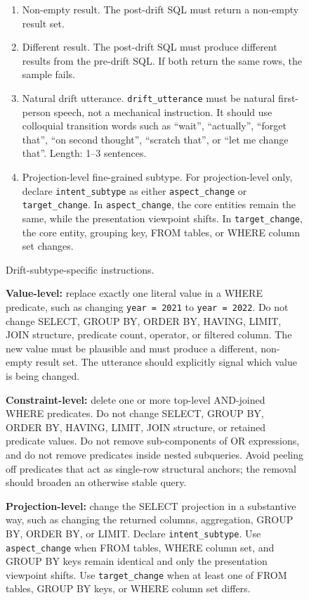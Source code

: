 \begin{figure}[t]
\begin{tcolorbox}[
  width=1.03\textwidth,
  enhanced,
  colback=white,
  colframe=black,
  boxrule=0.5pt,
  arc=0.8mm,
  left=1.6mm,
  right=1.6mm,
  top=1.3mm,
  bottom=1.3mm
]
\begin{enumerate}[leftmargin=1.8em,itemsep=0.22em,topsep=0.15em,label=R\arabic*.]
    \item Non-empty result.
    The post-drift SQL must return a non-empty result set.

    \item Different result.
    The post-drift SQL must produce different results from the pre-drift SQL. If
    both return the same rows, the sample fails.

    \item Natural drift utterance.
    \texttt{drift\_utterance} must be natural first-person speech, not a
    mechanical instruction. It should use colloquial transition words such as
    ``wait'', ``actually'', ``forget that'', ``on second thought'', ``scratch
    that'', or ``let me change that''. Length: 1--3 sentences.

    \item Projection-level fine-grained subtype.
    For projection-level only, declare \texttt{intent\_subtype} as either
    \texttt{aspect\_change} or \texttt{target\_change}. In
    \texttt{aspect\_change}, the core entities remain the same, while the
    presentation viewpoint shifts. In \texttt{target\_change}, the core entity,
    grouping key, FROM tables, or WHERE column set changes.
\end{enumerate}

\vspace{0.35em}
\noindent Drift-subtype-specific instructions.

\noindent
\textbf{Value-level:} replace exactly one literal value in a WHERE predicate,
such as changing \texttt{year = 2021} to \texttt{year = 2022}. Do not change
SELECT, GROUP BY, ORDER BY, HAVING, LIMIT, JOIN structure, predicate count,
operator, or filtered column. The new value must be plausible and must produce a
different, non-empty result set. The utterance should explicitly signal which
value is being changed.

\noindent
\textbf{Constraint-level:} delete one or more top-level AND-joined WHERE
predicates. Do not change SELECT, GROUP BY, ORDER BY, HAVING, LIMIT, JOIN
structure, or retained predicate values. Do not remove sub-components of OR
expressions, and do not remove predicates inside nested subqueries. Avoid peeling
off predicates that act as single-row structural anchors; the removal should
broaden an otherwise stable query.

\noindent
\textbf{Projection-level:} change the SELECT projection in a substantive way,
such as changing the returned columns, aggregation, GROUP BY, ORDER BY, or
LIMIT. Declare \texttt{intent\_subtype}. Use \texttt{aspect\_change} when FROM
tables, WHERE column set, and GROUP BY keys remain identical and only the
presentation viewpoint shifts. Use \texttt{target\_change} when at least one of
FROM tables, GROUP BY keys, or WHERE column set differs.


\end{tcolorbox}
\end{figure}

